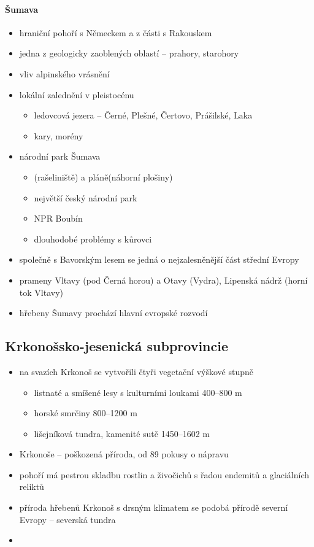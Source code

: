 \paragraph{Šumava}
\begin{itemize}
\item hraniční pohoří s Německem a z části s Rakouskem
\item jedna z geologicky zaoblených oblastí -- prahory, starohory
\item vliv alpinského vrásnění
\item lokální zalednění v pleistocénu
	\begin{itemize}
	\item ledovcová jezera -- Černé, Plešné, Čertovo, Prášilské, Laka
\item kary, morény
	\end{itemize}
\item národní park Šumava
	\begin{itemize}
	\item (rašeliniště) a pláně(náhorní plošiny)
	\item největší český národní park
	\item NPR Boubín
	\item dlouhodobé problémy s kůrovci
	\end{itemize}
\item společně s Bavorským lesem se jedná o nejzalesněnější část střední Evropy
\item prameny Vltavy (pod Černá horou) a Otavy (Vydra), Lipenská nádrž (horní tok Vltavy)
\item hřebeny Šumavy prochází hlavní evropské rozvodí
\end{itemize}

\subsection{Krkonošsko-jesenická subprovincie}
\begin{itemize}
\item na svazích Krkonoš se vytvořili čtyři vegetační výškové stupně
	\begin{itemize}
	\item listnaté a smíšené lesy s kulturními loukami 400--800 m
	\item horské smrčiny 800--1200 m
	\item lišejníková tundra, kamenité sutě 1450--1602 m
	\end{itemize}
\item Krkonoše -- poškozená příroda, od 89 pokusy o nápravu
\item pohoří má pestrou skladbu rostlin a živočichů s řadou endemitů a glaciálních reliktů
\item příroda hřebenů Krkonoš s drsným klimatem se podobá přírodě severní Evropy -- severská tundra
\item 
\end{itemize}

